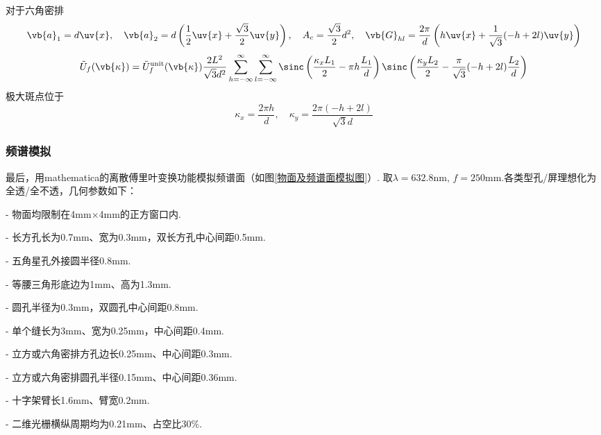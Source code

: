 \begin{example}
	对于六角密排
	\begin{equation*}
		\vb{a}_1 = d \uv{x}, \quad \vb{a}_2 = d \left( \frac{1}{2} \uv{x} + \frac{\sqrt{3}}{2} \uv{y} \right), \quad A_c = \frac{\sqrt{3}}{2} d^2, \quad \vb{G}_{hl} = \frac{2\pi}{d} \left( h \uv{x} + \frac{1}{\sqrt{3}} (-h + 2l) \uv{y} \right)
	\end{equation*}
	\begin{equation*}
		\tilde{U}_f(\vb{\kappa}) = \tilde{U}_f^{\text{unit}}(\vb{\kappa}) \frac{2 L^2}{\sqrt{3} d^2} \sum_{h=-\infty}^{\infty} \sum_{l=-\infty}^{\infty} \sinc\left( \frac{\kappa_x L_1}{2} - \pi h \frac{L_1}{d} \right) \sinc\left( \frac{\kappa_y L_2}{2} - \frac{\pi}{\sqrt{3}} (-h + 2l) \frac{L_2}{d} \right)
	\end{equation*}
	极大斑点位于
	\begin{equation*}
		\kappa_x=\frac{2\pi h}{d},\quad \kappa_y=\frac{2\pi(-h+2l)}{\sqrt{3}d}
	\end{equation*}
\end{example}

\subsubsection{频谱模拟}
最后，用mathematica的离散傅里叶变换功能模拟频谱面（如图\ref{物面及频谱面模拟图}）.
取\(\lambda=632.8\text{nm},\,f=250\text{mm}\).各类型孔/屏理想化为全透/全不透，几何参数如下：

- 物面均限制在4mm\(\times\)4mm的正方窗口内.

- 长方孔长为0.7mm、宽为0.3mm，双长方孔中心间距0.5mm.

- 五角星孔外接圆半径0.8mm.

- 等腰三角形底边为1mm、高为1.3mm.

- 圆孔半径为0.3mm，双圆孔中心间距0.8mm.

- 单个缝长为3mm、宽为0.25mm，中心间距0.4mm.

- 立方或六角密排方孔边长0.25mm、中心间距0.3mm.

- 立方或六角密排圆孔半径0.15mm、中心间距0.36mm.

- 十字架臂长1.6mm、臂宽0.2mm.

- 二维光栅横纵周期均为0.21mm、占空比30\(\%\).


